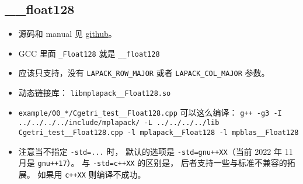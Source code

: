 
\begin{issues}
\issueDraft
\end{issues}


\subsection{\_\_float128}
\begin{itemize}
\item 源码和 manual 见 \href{https://github.com/nakatamaho/mplapack}{github}。
\item GCC 里面 \verb`_Float128` 就是 \verb`__float128`
\item 应该只支持，没有 \verb`LAPACK_ROW_MAJOR` 或者 \verb`LAPACK_COL_MAJOR` 参数。
\item 动态链接库： \verb`libmplapack__Float128.so`
\item \verb`example/00_*/Cgetri_test__Float128.cpp` 可以这么编译： \verb`g++ -g3 -I ../../../../include/mplapack/ -L ../../../../lib Cgetri_test__Float128.cpp -l mplapack__Float128 -l mpblas__Float128`
\item 注意当不指定 \verb`-std=...` 时， 默认的选项是 \verb`-std=gnu++XX`（当前 2022 年 11 月是 \verb`gnu++17`）。 与 \verb`-std=c++XX` 的区别是， 后者支持一些与标准不兼容的拓展。 如果用 \verb`c++XX` 则编译不成功。
\end{itemize}

